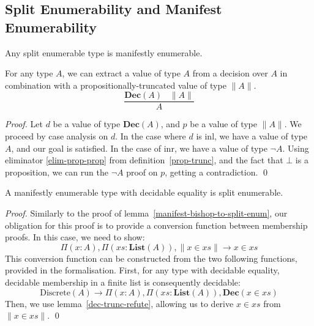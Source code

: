 \subsection{Split Enumerability and Manifest Enumerability}
\begin{romlemma} \label{split-enum-to-manifest-enum}
  Any split enumerable type is manifestly enumerable.
\end{romlemma}
\begin{romlemma} \label{dec-trunc-refute}
  For any type \(A\), we can extract a value of type \(A\) from a decision over
  \(A\) in combination with a propositionally-truncated value of type \(\lVert A \rVert\).
  \begin{equation}
    \frac{
      \mathbf{Dec}(A) \; \; \; \lVert A \rVert
    }{
      A
    }
  \end{equation}
\end{romlemma}
\begin{proof}
  Let \(d\) be a value of type \(\mathbf{Dec}(A)\), and \(p\) be a value of type
  \(\lVert A \rVert\).
  We proceed by case analysis on \(d\).
  In the case where \(d\) is inl, we have a value of type \(A\), and our goal is
  satisfied.
  In the case of inr, we have a value of type \(\neg A\).
  Using eliminator \ref{elim-prop-prop} from definition~\ref{prop-trunc}, and
  the fact that \(\bot\) is a proposition, we can run the \(\neg A\) proof on
  \(p\), getting a contradiction.
  \qed
\end{proof}
\begin{romlemma} \label{manifest-enum-to-split-enum}
  A manifestly enumerable type with decidable equality is split enumerable.
\end{romlemma}
\begin{proof}
  Similarly to the proof of lemma~\ref{manifest-bishop-to-split-enum}, our
  obligation for this proof is to provide a conversion function between
  membership proofs.
  In this case, we need to show:
  \begin{equation}
    \Pi(x : A) , \Pi(\mathit{xs} : \mathbf{List}(A)) , \lVert x \in \mathit{xs} \rVert \rightarrow x \in \mathit{xs}
  \end{equation}
  This conversion function can be constructed from the two following functions,
  provided in the formalisation.
  First, for any type with decidable equality, decidable membership in a finite
  list is consequently decidable:
  \begin{equation}
    \text{Discrete}(A) \rightarrow \Pi(x : A) , \Pi(\mathit{xs} : \mathbf{List}(A)) , \mathbf{Dec}(x \in \mathit{xs})
  \end{equation}
  Then, we use lemma~\ref{dec-trunc-refute}, allowing us to derive \(x \in
  \mathit{xs}\) from \(\lVert x \in \mathit{xs} \rVert\).
  \qed
\end{proof}
